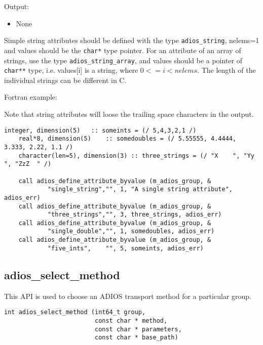 Output:
\begin{itemize}
\item None
\end{itemize}

Simple string attributes should be defined with the type \verb+adios_string+, nelems=1 and values should be the \verb+char*+ type pointer. For an attribute of an array of strings, use the type \verb+adios_string_array+, and values should be a pointer of \verb+char**+ type, i.e. values[i] is a string, where $0<=i<nelems$. The length of the individual strings can be different in C.

Fortran example: 

Note that string attributes will loose the trailing space characters in the output. 

\begin{lstlisting}[alsolanguage=Fortran,caption={},label={}]
    integer, dimension(5)   :: someints = (/ 5,4,3,2,1 /)
    real*8, dimension(5)    :: somedoubles = (/ 5.55555, 4.4444, 3.333, 2.22, 1.1 /)
    character(len=5), dimension(3) :: three_strings = (/ "X    ", "Yy   ", "ZzZ  " /)

    call adios_define_attribute_byvalue (m_adios_group, &
            "single_string","", 1, "A single string attribute", adios_err)
    call adios_define_attribute_byvalue (m_adios_group, &
            "three_strings","", 3, three_strings, adios_err)
    call adios_define_attribute_byvalue (m_adios_group, &
            "single_double","", 1, somedoubles, adios_err)
    call adios_define_attribute_byvalue (m_adios_group, &
            "five_ints",    "", 5, someints, adios_err)
\end{lstlisting}


\subsection{adios\_select\_method}
This API is used to choose an ADIOS transport method for a particular group. 

\begin{lstlisting}[alsolanguage=C,caption={},label={}]
int adios_select_method (int64_t group, 
                         const char * method,
                         const char * parameters,
                         const char * base_path)
\end{lstlisting}

